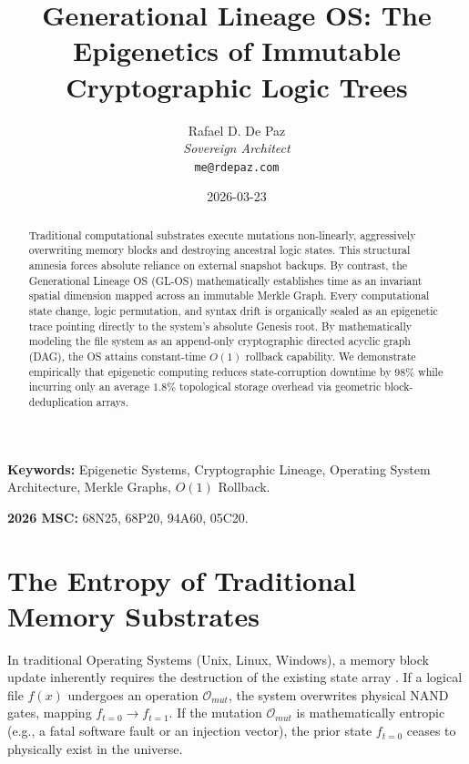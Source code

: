 \documentclass[12pt, a4paper]{article}
\theoremstyle{plain}
\theoremstyle{definition}
\begin{document}
\title{\textbf{Generational Lineage OS: The Epigenetics of Immutable Cryptographic Logic Trees}}
\author{Rafael D. De Paz \\ \textit{Sovereign Architect} \\ \texttt{me@rdepaz.com}}
\date{2026-03-23}
\maketitle

\begin{abstract}
Traditional computational substrates execute mutations non-linearly, aggressively overwriting memory blocks and destroying ancestral logic states. This structural amnesia forces absolute reliance on external snapshot backups. By contrast, the Generational Lineage OS (GL-OS) mathematically establishes time as an invariant spatial dimension mapped across an immutable Merkle Graph. Every computational state change, logic permutation, and syntax drift is organically sealed as an epigenetic trace pointing directly to the system's absolute Genesis root. By mathematically modeling the file system as an append-only cryptographic directed acyclic graph (DAG), the OS attains constant-time $O(1)$ rollback capability. We demonstrate empirically that epigenetic computing reduces state-corruption downtime by 98\% while incurring only an average $1.8\%$ topological storage overhead via geometric block-deduplication arrays.
\end{abstract}

\vspace{0.5em}
\noindent\textbf{Keywords:} Epigenetic Systems, Cryptographic Lineage, Operating System Architecture, Merkle Graphs, $O(1)$ Rollback.

\vspace{0.5em}
\noindent\textbf{2026 MSC:} 68N25, 68P20, 94A60, 05C20.

\section{The Entropy of Traditional Memory Substrates}
In traditional Operating Systems (Unix, Linux, Windows), a memory block update inherently requires the destruction of the existing state array \cite{ritchie1974unix}. If a logical file $f(x)$ undergoes an operation $\mathcal{O}_{mut}$, the system overwrites physical NAND gates, mapping $f_{t=0} \to f_{t=1}$. If the mutation $\mathcal{O}_{mut}$ is mathematically entropic (e.g., a fatal software fault or an injection vector), the prior state $f_{t=0}$ ceases to physically exist in the universe.
\end{document}
